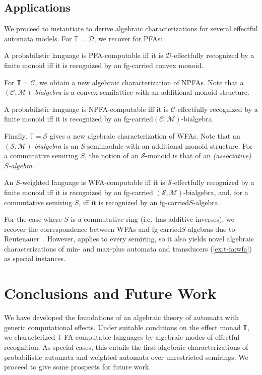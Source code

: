 \documentclass[a4paper, UKenglish, numberwithinsect, thm-restate, cleveref, final]{lipics-v2021}
\theoremstyle{plain}
\theoremstyle{definition}
\newcommand{\finite}{fg-carried\xspace}
\renewcommand{\S}{\mathcal{S}}
\newcommand{\C}{\ensuremath{\mathcal{C}}}
\newcommand{\T}{\ensuremath{\mathbb{T}}\xspace}
\newcommand{\M}{\ensuremath{\mathcal{M}}\xspace}
\newcommand{\D}{\ensuremath{\mathcal{D}}}
\numberwithin{equation}{section}
\begin{document}
\subsection{Applications}
We proceed to instantiate  to derive algebraic characterizations for several effectful automata models. For $\T=\D$, we recover  for PFAs:
\begin{theorem}\label{thm:pfa-alg}
A probabilistic language is PFA-computable iff it is $\D$-effectfully recognized by a finite monoid iff it is recognized by an \finite convex monoid.
\end{theorem}
 For $\T=\C$, we obtain a new algebraic characterization of NPFAs. Note that a \emph{$(\C,\M)$-bialgebra} is a convex semilattice with an additional monoid structure.
\begin{theorem}\label{thm:npfa-alg}
$\!$A probabilistic language is NPFA-computable iff it is $\C$-effectfully recognized by a finite monoid iff it is recognized by an \finite $(\C,\M)$-bialgebra.
\end{theorem}
Finally, $\T=\S$ gives a new algebraic characterization of WFAs. Note that an \emph{$(\S,\M)$-bialgebra} is an $S$-semimodule with an additional monoid structure. For a commutative semiring $S$, the notion of an $\S$-monoid is that of an \emph{(associative) $S$-algebra}.
\begin{theorem}\label{thm:wfa-alg}
An $S$-weighted language is WFA-computable iff it is $\S$-effectfully
recognized by a finite monoid iff it is recognized by an \finite
$(\S,\M)$-bialgebra, and, for a commutative semiring $S$, iff it is recognized by an \finite $S$-algebra.
\end{theorem}
For the case where $S$ is a commutative {ring} (i.e.~has additive inverses), we recover the
correspondence between WFAs and \finite $S$-algebras due to Reutenauer~\cite{reu80}. However,
 applies to every semiring, so it also yields novel algebraic characterizations of min- and max-plus automata and transducers (\ref{ex:t-fa:wfa}) as special instances.




\section{Conclusions and Future Work}

We have developed the foundations of an algebraic theory of automata with generic computational
effects. Under suitable conditions on the effect monad \T{}, we characterized
$\T$-FA-computable languages by algebraic modes of effectful recognition. As special cases,
this entails the first algebraic characterizations of probabilistic automata and weighted
automata over unrestricted semirings. We proceed to give some prospects for future work.
\end{document}
